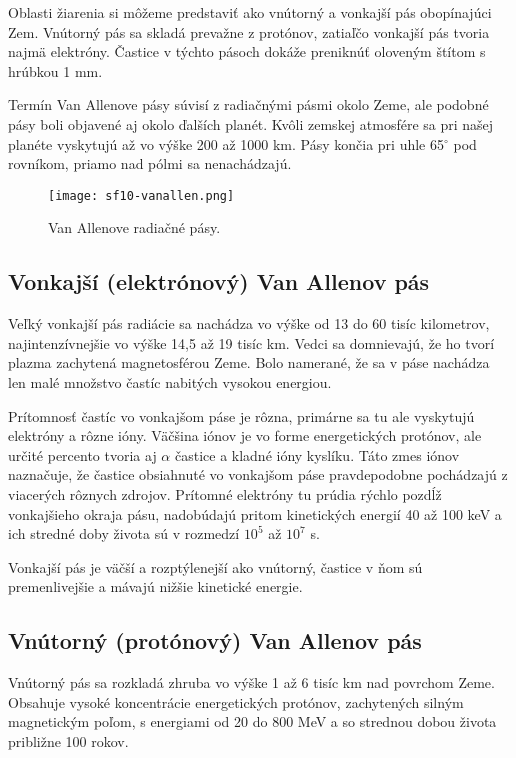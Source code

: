 \documentclass[../../main.tex]{subfiles}
\begin{document}
Oblasti žiarenia si môžeme predstaviť ako vnútorný a vonkajší pás obopínajúci Zem. Vnútorný pás sa skladá prevažne z protónov, zatiaľčo vonkajší pás tvoria najmä elektróny. Častice v týchto pásoch dokáže preniknúť oloveným štítom s hrúbkou 1 mm.

Termín Van Allenove pásy súvisí z radiačnými pásmi okolo Zeme, ale podobné pásy boli objavené aj okolo ďalších planét. Kvôli zemskej atmosfére sa pri našej planéte vyskytujú až vo výške 200 až 1000 km. Pásy končia pri uhle 65$^\circ$ pod rovníkom, priamo nad pólmi sa nenachádzajú.

\begin{figure}[h]
\centering
\texttt{[image: sf10-vanallen.png]}
\caption{Van Allenove radiačné pásy.}
\label{sf10:img:vanallen}
\end{figure}

\subsection{Vonkajší (elektrónový) Van Allenov pás}

Veľký vonkajší pás radiácie sa nachádza vo výške od 13 do 60 tisíc kilometrov, najintenzívnejšie vo výške 14,5 až 19 tisíc km. Vedci sa domnievajú, že ho tvorí plazma zachytená magnetosférou Zeme. Bolo namerané, že sa v páse nachádza len malé množstvo častíc nabitých vysokou energiou.

Prítomnosť častíc vo vonkajšom páse je rôzna, primárne sa tu ale vyskytujú elektróny a rôzne ióny. Väčšina iónov je vo forme energetických protónov, ale určité percento tvoria aj $\alpha$ častice a kladné ióny kyslíku. Táto zmes iónov naznačuje, že častice obsiahnuté vo vonkajšom páse pravdepodobne pochádzajú z viacerých rôznych zdrojov. Prítomné elektróny tu prúdia rýchlo pozdĺž vonkajšieho okraja pásu, nadobúdajú pritom kinetických energií 40 až 100 keV a ich stredné doby života sú v rozmedzí $10^5$ až $10^7$ s.

Vonkajší pás je väčší a rozptýlenejší ako vnútorný, častice v ňom sú premenlivejšie a mávajú nižšie kinetické energie.

\subsection{Vnútorný (protónový) Van Allenov pás}

Vnútorný pás sa rozkladá zhruba vo výške 1 až 6 tisíc km nad povrchom Zeme. Obsahuje vysoké koncentrácie energetických protónov, zachytených silným magnetickým poľom, s energiami od 20 do 800 MeV a so strednou dobou života približne 100 rokov.
\end{document}
